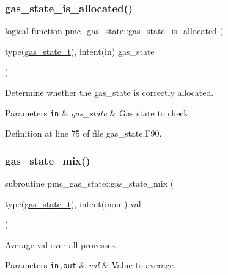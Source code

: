 \subsubsection{\texorpdfstring{gas\+\_\+state\+\_\+is\+\_\+allocated()}{gas\_state\_is\_allocated()}}
{\footnotesize\ttfamily logical function pmc\+\_\+gas\+\_\+state\+::gas\+\_\+state\+\_\+is\+\_\+allocated (\begin{DoxyParamCaption}\item[{type(\mbox{\hyperlink{structpmc__gas__state_1_1gas__state__t}{gas\+\_\+state\+\_\+t}}), intent(in)}]{gas\+\_\+state }\end{DoxyParamCaption})}



Determine whether the {\ttfamily gas\+\_\+state} is correctly allocated. 


\begin{DoxyParams}[1]{Parameters}
\mbox{\tt in}  & {\em gas\+\_\+state} & Gas state to check. \\
\hline
\end{DoxyParams}


Definition at line 75 of file gas\+\_\+state.\+F90.

\mbox{\label{namespacepmc__gas__state_a119c0276d5da30938468361b975dad19}} 
\subsubsection{\texorpdfstring{gas\+\_\+state\+\_\+mix()}{gas\_state\_mix()}}
{\footnotesize\ttfamily subroutine pmc\+\_\+gas\+\_\+state\+::gas\+\_\+state\+\_\+mix (\begin{DoxyParamCaption}\item[{type(\mbox{\hyperlink{structpmc__gas__state_1_1gas__state__t}{gas\+\_\+state\+\_\+t}}), intent(inout)}]{val }\end{DoxyParamCaption})}



Average val over all processes. 


\begin{DoxyParams}[1]{Parameters}
\mbox{\tt in,out}  & {\em val} & Value to average. \\
\hline
\end{DoxyParams}


